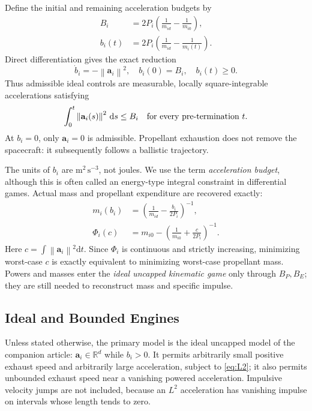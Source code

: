 \documentclass[journal,a4paper]{IEEEtran}
\newcommand{\R}{\mathbb R}
\newcommand{\norm}[1]{\left\|#1\right\|}
\newcommand{\dd}{\mathrm d}
\begin{document}
Define the initial and remaining acceleration budgets by
\begin{align}
 B_i&=2P_i\left(\frac1{m_{id}}-\frac1{m_{i0}}\right),\label{eq:B}\\
 b_i(t)&=2P_i\left(\frac1{m_{id}}-\frac1{m_i(t)}\right).
 \label{eq:b}
\end{align}
Direct differentiation gives the exact reduction
\begin{equation}
 \boxed{\dot b_i=-\norm{\mathbf a_i}^2,\quad
 b_i(0)=B_i,\quad b_i(t)\ge0.}
 \label{eq:budget}
\end{equation}
Thus admissible ideal controls are measurable, locally square-integrable accelerations satisfying
\begin{equation}
 \int_0^t\norm{\mathbf a_i(s)}^2\,\dd s\le B_i
 \quad\hbox{for every pre-termination }t.
 \label{eq:L2}
\end{equation}
At $b_i=0$, only $\mathbf a_i=0$ is admissible. Propellant exhaustion does not remove the spacecraft: it subsequently follows a ballistic trajectory.

The units of $b_i$ are $\mathrm{m^2\,s^{-3}}$, not joules. We use the term \emph{acceleration budget}, although this is often called an energy-type integral constraint in differential games. Actual mass and propellant expenditure are recovered exactly:
\begin{align}
 m_i(b_i)&=\left(\frac1{m_{id}}-\frac{b_i}{2P_i}\right)^{-1},\label{eq:recovermass}\\
 \Phi_i(c)&=m_{i0}-\left(\frac1{m_{i0}}+\frac{c}{2P_i}\right)^{-1}.
 \label{eq:propellant}
\end{align}
Here $c=\int\norm{\mathbf a_i}^2\dd t$. Since $\Phi_i$ is continuous and strictly increasing, minimizing worst-case $c$ is exactly equivalent to minimizing worst-case propellant mass. Powers and masses enter the \emph{ideal uncapped kinematic game} only through $B_P,B_E$; they are still needed to reconstruct mass and specific impulse.

\subsection{Ideal and Bounded Engines}
Unless stated otherwise, the primary model is the ideal uncapped model of the companion article: $\mathbf a_i\in\R^d$ while $b_i>0$. It permits arbitrarily small positive exhaust speed and arbitrarily large acceleration, subject to \eqref{eq:L2}; it also permits unbounded exhaust speed near a vanishing powered acceleration. Impulsive velocity jumps are not included, because an $L^2$ acceleration has vanishing impulse on intervals whose length tends to zero.
\end{document}
